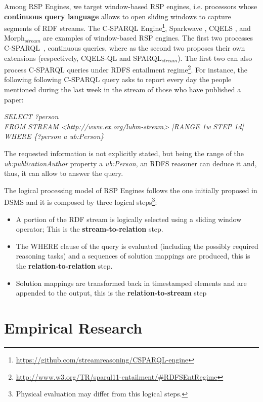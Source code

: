 Among RSP Engines, we target window-based RSP engines, i.e. processors whose \textbf{continuous query language} allows to open sliding windows to capture segments of RDF streams. The C-SPARQL Engine\footnote{\url{https://github.com/streamreasoning/CSPARQL-engine}}, Sparkwave \cite{DBLP:conf/debs/KomazecCF12}, CQELS \cite{Lephuoc2011}, and Morph$_{stream}$ \cite{Calbimonte2012}  are examples of window-based RSP engines.  The first two processes C-SPARQL~\cite{Barbieri2010}, continuous queries, where as the second two proposes their own extensions (respectively, CQELS-QL and SPARQL$_{stream}$). The first two can also process C-SPARQL queries under RDFS entailment regime\footnote{\url{http://www.w3.org/TR/sparql11-entailment/#RDFSEntRegime}}. For instance, the following  following C-SPARQL query asks to report every day the people mentioned during the last week in the stream of those who have published a paper:

\vspace{5pt}
\noindent\textit{SELECT ?person}\\
\textit{FROM STREAM <http://www.ex.org/lubm-stream> [RANGE 1w STEP 1d]}\\
\textit{WHERE \{?person a ub:Person\}}
\vspace{5pt}

The requested information is not explicitly stated, but being the range of the \textit{ub:publicationAuthor} property a \textit{ub:Person}, an RDFS reasoner can deduce it and, thus, it can allow to answer the query.

The logical processing model of RSP Engines follows the one initially proposed in DSMS and it is composed by three logical steps\footnote{Physical evaluation may differ from this logical steps.}: 
\begin{itemize}
\item[1.] A portion of the RDF stream is logically selected using a sliding window operator; This is the \textbf{stream-to-relation} step. 
\item[2.] The WHERE clause of the query is evaluated (including the possibly required reasoning tasks) and a sequences of solution mappings are produced, this is the \textbf{relation-to-relation} step.
\item[3.] Solution mappings are transformed back in timestamped elements and are appended to the output, this is the \textbf{relation-to-stream} step 
\end{itemize}


\section{Empirical Research}\label{sec:empirical-research}

